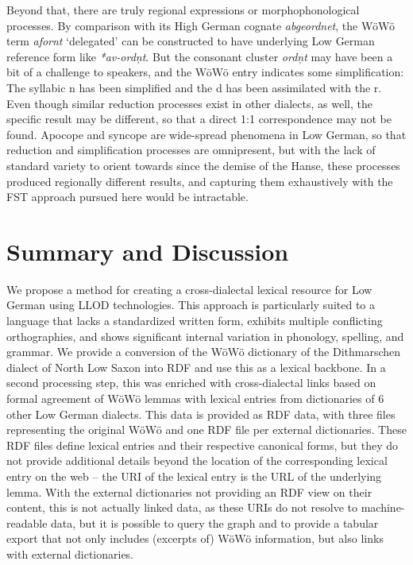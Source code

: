 \documentclass[11pt]{article}
\newcommand{\word}[1]{\textsl{#1}} %
\begin{document}
\begin{enumerate}
Beyond that, there are truly regional expressions or morphophonological processes. By comparison with its High German cognate \word{abgeordnet}, the WöWö term \word{afornt} `delegated' can be constructed to have underlying Low German reference form like \word{*av-ordņt}. But the consonant cluster \word{ordņt} may have been a bit of a challenge to speakers, and the WöWö entry indicates some simplification: The syllabic n has been simplified and the d has been assimilated with the r. Even though similar reduction processes exist in other dialects, as well, the specific result may be different, so that a direct 1:1 correspondence may not be found. Apocope and syncope are wide-spread phenomena in Low German, so that reduction and simplification processes are omnipresent, but with the lack of standard variety to orient towards since the demise of the Hanse, these processes produced regionally different results, and capturing them exhaustively with the FST approach pursued here would be intractable.

\section{Summary and Discussion}

We propose a method for creating a cross-dialectal lexical resource for Low German using LLOD technologies. This approach is particularly suited to a language that lacks a standardized written form, exhibits multiple conflicting orthographies, and shows significant internal variation in phonology, spelling, and grammar. 
We provide a conversion of the WöWö dictionary of the Dithmarschen dialect of North Low Saxon into RDF and use this as a lexical backbone. In a second processing step, this was enriched with cross-dialectal links based on formal agreement of WöWö lemmas with lexical entries from dictionaries of 6 other Low German dialects.
This data is provided as RDF data, with three files representing the original WöWö and one RDF file per external dictionaries. These RDF files define lexical entries and their respective canonical forms, but they do not provide additional details beyond the location of the corresponding lexical entry on the web -- the URI of the lexical entry is the URL of the underlying lemma. With the external dictionaries not providing an RDF view on their content, this is not actually linked data, as these URIs do not resolve to machine-readable data, but it is possible to query the graph and to provide a tabular export that not only includes (excerpts of) WöWö information, but also links with external dictionaries.


\end{enumerate}
\end{document}
